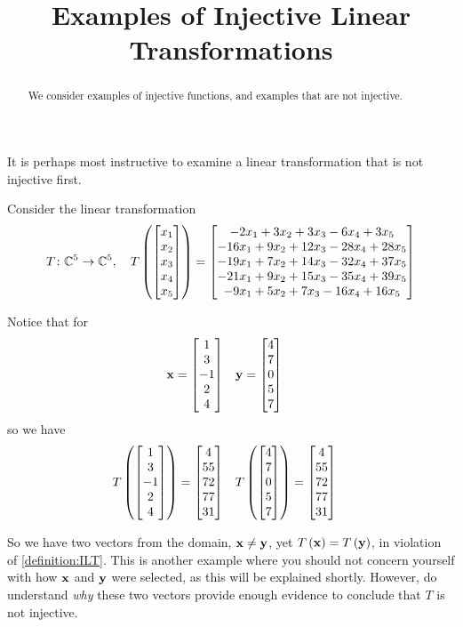 \documentclass{ximera}
\title{Examples of Injective Linear Transformations}
\begin{document}
\begin{abstract}
  We consider examples of injective functions, and examples that are not injective.
\end{abstract}
\maketitle

It is perhaps most instructive to examine a linear transformation that is not injective first.

\begin{example}

Consider the linear transformation
\[
T\colon \mathbb{C}^{5}\rightarrow\mathbb{C}^{5},\quad
T\left(\begin{bmatrix}x_1\\x_2\\x_3\\x_4\\x_5\end{bmatrix}\right)=
\begin{bmatrix}-2 x_1 + 3 x_2 + 3 x_3 - 6 x_4 + 3 x_5\\
-16 x_1 + 9 x_2 + 12 x_3 - 28 x_4 + 28 x_5\\
-19 x_1 + 7 x_2 + 14 x_3 - 32 x_4 + 37 x_5\\
-21 x_1 + 9 x_2 + 15 x_3 - 35 x_4 + 39 x_5\\
-9 x_1 + 5 x_2 + 7 x_3 - 16 x_4 + 16 x_5\end{bmatrix}
\]

Notice that for
\begin{align*}
\mathbf{x}&=\begin{bmatrix}1\\3\\-1\\2\\4\end{bmatrix}&
\mathbf{y}&=\begin{bmatrix}4\\7\\0\\5\\7\end{bmatrix}
\end{align*}
so we have
\begin{align*}
T\left(\begin{bmatrix}1\\3\\-1\\2\\4\end{bmatrix}\right)&=\begin{bmatrix}4\\55\\72\\77\\31\end{bmatrix}&
T\left(\begin{bmatrix}4\\7\\0\\5\\7\end{bmatrix}\right)&=\begin{bmatrix}4\\55\\72\\77\\31\end{bmatrix}
\end{align*}

So we have two vectors from the domain, $\mathbf{x}\neq\mathbf{y}$, yet $T\left(\mathbf{x}\right)=T\left(\mathbf{y}\right)$, in violation of \ref{definition:ILT}.  This is another example where you should not concern yourself with how $\mathbf{x}$ and $\mathbf{y}$ were selected, as this will be explained shortly.  However, do understand \textit{why} these two vectors provide enough evidence to conclude that $T$ is not injective.

\end{example}
\end{document}
